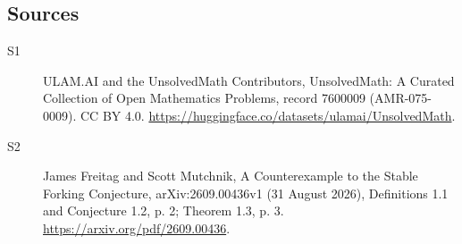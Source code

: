 \documentclass[11pt]{article}
\begin{document}
\subsection{Sources}
\begin{description}
\item[\hypertarget{source:7600009:1}{S1}] ULAM.AI and the UnsolvedMath Contributors, UnsolvedMath: A Curated Collection of Open Mathematics Problems, record 7600009 (AMR-075-0009). CC BY 4.0. \url{https://huggingface.co/datasets/ulamai/UnsolvedMath}.
\item[\hypertarget{source:7600009:2}{S2}] James Freitag and Scott Mutchnik, A Counterexample to the Stable Forking Conjecture, arXiv:2609.00436v1 (31 August 2026), Definitions 1.1 and Conjecture 1.2, p. 2; Theorem 1.3, p. 3. \url{https://arxiv.org/pdf/2609.00436}.
\end{description}
\label{end:7600009}
\end{document}
